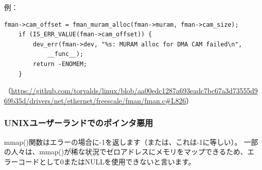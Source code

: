例：

\begin{lstlisting}[style=customc]
	fman->cam_offset = fman_muram_alloc(fman->muram, fman->cam_size);
	if (IS_ERR_VALUE(fman->cam_offset)) {
		dev_err(fman->dev, "%s: MURAM alloc for DMA CAM failed\n",
			__func__);
		return -ENOMEM;
	}
\end{lstlisting}

（\url{https://github.com/torvalds/linux/blob/aa00edc1287a693eadc7bc67a3d73555d969b35d/drivers/net/ethernet/freescale/fman/fman.c#L826}）

\subsubsection{UNIXユーザーランドでのポインタ悪用}

mmap()関数はエラーの場合に-1を返します（または、これは-1に等しい）。
一部の人々は、mmap()が稀な状況でゼロアドレスにメモリをマップできるため、エラーコードとして0またはNULLを使用できないと言います。
